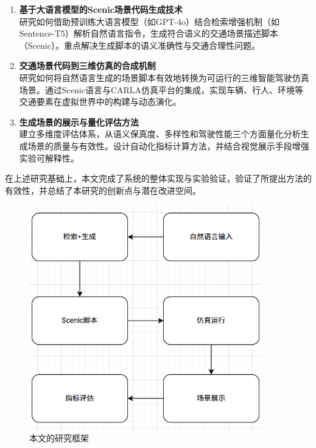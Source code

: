 \begin{enumerate}
	\item \textbf{基于大语言模型的Scenic场景代码生成技术} \\
	研究如何借助预训练大语言模型（如GPT-4o）结合检索增强机制（如Sentence-T5）解析自然语言指令，生成符合语义的交通场景描述脚本（Scenic）。重点解决生成脚本的语义准确性与交通合理性问题。
	
	\item \textbf{交通场景代码到三维仿真的合成机制} \\
	研究如何将自然语言生成的场景脚本有效地转换为可运行的三维智能驾驶仿真场景。通过Scenic语言与CARLA仿真平台的集成，实现车辆、行人、环境等交通要素在虚拟世界中的构建与动态演化。
	
	\item \textbf{生成场景的展示与量化评估方法} \\
	建立多维度评估体系，从语义保真度、多样性和驾驶性能三个方面量化分析生成场景的质量与有效性。设计自动化指标计算方法，并结合视觉展示手段增强实验可解释性。
\end{enumerate}

在上述研究基础上，本文完成了系统的整体实现与实验验证，验证了所提出方法的有效性，并总结了本研究的创新点与潜在改进空间。

\begin{figure}[H]
	\centering
	\includegraphics[width=0.9\textwidth]{../images/研究架构图.png} 
	\caption{本文的研究框架}
	\label{fig:research_framework}
\end{figure}
